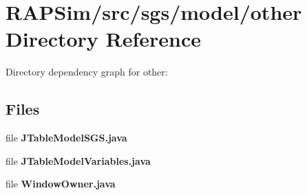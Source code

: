 \section{R\-A\-P\-Sim/src/sgs/model/other Directory Reference}
\label{dir_9180b4e6e04984c01a9682d14064f573}
Directory dependency graph for other\-:
\subsection*{Files}
\begin{DoxyCompactItemize}
\item 
file {\bf J\-Table\-Model\-S\-G\-S.\-java}
\item 
file {\bf J\-Table\-Model\-Variables.\-java}
\item 
file {\bf Window\-Owner.\-java}
\end{DoxyCompactItemize}

